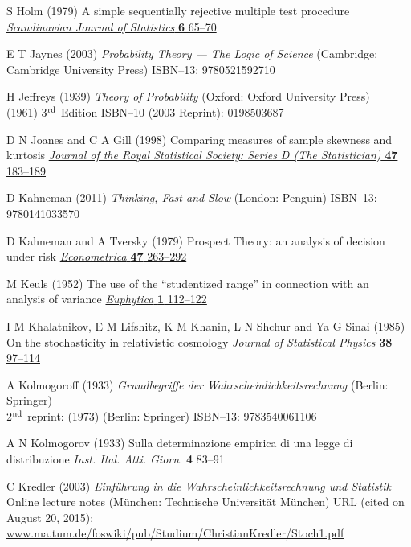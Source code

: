 \begin{thebibliography}{99}
S Holm
(1979) A simple sequentially rejective multiple test procedure
\href{http://www.jstor.org/stable/4615733}{\textit{Scandinavian 
Journal of Statistics} \textbf{6} 65--70}

E T Jaynes
(2003) \textit{Probability Theory --- The Logic of Science}
(Cambridge: Cambridge University Press) 
ISBN--13: 9780521592710

H Jeffreys
(1939) \textit{Theory of Probability} 
(Oxford: Oxford University Press)\\
(1961) 3$^{\rm rd}$ Edition
ISBN--10 (2003 Reprint): 0198503687

D N Joanes and C A Gill
(1998) Comparing measures of sample skewness and kurtosis 
\href{http://dx.doi.org/10.1111/1467-9884.00122}{\textit{Journal of 
the Royal Statistical Society: Series D (The Statistician)} \textbf{
47} 183--189}

D Kahneman
(2011) \textit{Thinking, Fast and Slow} (London: Penguin)
ISBN--13: 9780141033570

D Kahneman and A Tversky
(1979) Prospect Theory: an analysis of decision under risk
\href{http://www.jstor.org/stable/1914185}{\textit{Econometrica} 
\textbf{47} 263--292}

M Keuls
(1952) The use of the ``studentized range'' in connection with an 
analysis of variance
\href{http://dx.doi.org/10.1007/BF01908269}{\textit{Euphytica}
\textbf{1} 112--122}

I M Khalatnikov, E M Lifshitz, K M Khanin, L N Shchur and Ya G 
Sinai (1985) On the stochasticity in relativistic cosmology
\href{http://dx.doi.org/10.1007/BF01017851}{\textit{Journal of 
Statistical Physics} \textbf{38} 97--114}

A Kolmogoroff
(1933) \textit{Grundbegriffe der Wahrscheinlichkeitsrechnung}
(Berlin: Springer)\\
2$^{\rm nd}$ reprint: (1973) (Berlin: Springer) ISBN--13: 
9783540061106

A N Kolmogorov
(1933) Sulla determinazione empirica di una legge di distribuzione
\textit{Inst. Ital. Atti. Giorn.} \textbf{4} 83--91

C Kredler
(2003) \textit{Einf\"{u}hrung in die 
Wahrscheinlichkeitsrechnung und Statistik} Online lecture notes 
(M\"{u}nchen: Technische Universit\"{a}t M\"{u}nchen)
URL (cited on August 20, 2015): 
\href{http://www.ma.tum.de/foswiki/pub/Studium/ChristianKredler/Stoch1.pdf}{www.ma.tum.de/foswiki/pub/Studium/ChristianKredler/Stoch1.pdf}


\end{thebibliography}
